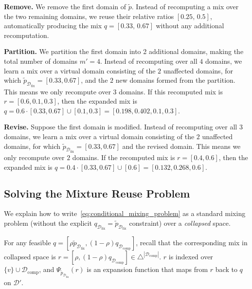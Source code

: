 \documentclass[table]{ai2style/ai2}
\newcommand{\D}[0]{\mathcal{D}}
\newcommand{\Dfix}[0]{\mathcal{D}_{\text{fix}}}
\newcommand{\Dcomp}[0]{\mathcal{D}_{\text{comp}}}
\begin{document}
\textbf{Remove.} We remove the first domain of $\tilde{p}$. Instead of recomputing a mix over the two remaining domains, we reuse their relative ratios $[0.25,\,0.5]$, automatically producing the mix $q=[0.33,\,0.67]$ without any additional recomputation.  

\textbf{Partition.} We partition the first domain into 2 additional domains, making the total number of domains $m'=4$. Instead of recomputing over all $4$ domains, we learn a mix over a virtual domain consisting of the $2$ unaffected domains, for which $\tilde{p}_{\Dfix} = [0.33, 0.67]$, and the $2$ new domains formed from the partition. This means we only recompute over $3$ domains. If this recomputed mix is $r = [0.6, 0.1, 0.3]$, then the expanded mix is $q = 0.6 \cdot [0.33, 0.67] \cup [0.1, 0.3] = [0.198, 0.402, 0.1, 0.3]$.

\textbf{Revise.} Suppose the first domain is modified. Instead of recomputing over all $3$ domains, we learn a mix over a virtual domain consisting of the $2$ unaffected domains, for which $\tilde{p}_{\Dfix} = [0.33, 0.67]$ and the revised domain. This means we only recompute over $2$ domains. If the recomputed mix is $r=[0.4, 0.6]$, then the expanded mix is $q = 0.4 \cdot [0.33, 0.67] \cup [0.6] = [0.132, 0.268, 0.6]$.

\subsection{Solving the Mixture Reuse Problem}\label{supp:collapsed_space}

We explain how to write~\eqref{eq:conditional_mixing_problem} as a standard mixing problem (without the explicit $q_{\Dfix} = \tilde{p}_{\Dfix}$ constraint) over a \textit{collapsed} space. 

For any feasible $q = [\rho \tilde{p}_{\Dfix}, (1 - \rho) q_{\Dcomp}]$, recall that the corresponding mix in collapsed space is $r = [\rho, (1 - \rho) q_{\Dcomp}] \in \triangle^{|\Dcomp|}$. $r$ is indexed over $\{v\} \cup \Dcomp$, and $\Psi_{\tilde{p}_{\Dfix}}(r)$ is an expansion function that maps from $r$ back to $q$ on $\D'$.
\end{document}

